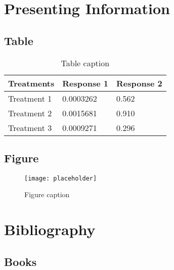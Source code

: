 \documentclass[11pt,fleqn]{book} %
\begin{document}


\chapter{Presenting Information}

\section{Table}

\begin{table}[h]
	\centering
	\begin{tabular}{l l l}
		\toprule
		\textbf{Treatments} & \textbf{Response 1} & \textbf{Response 2}\\
		\midrule
		Treatment 1 & 0.0003262 & 0.562 \\
		Treatment 2 & 0.0015681 & 0.910 \\
		Treatment 3 & 0.0009271 & 0.296 \\
		\bottomrule
	\end{tabular}
	\caption{Table caption}
\end{table}


\section{Figure}

\begin{figure}[h]
	\centering\texttt{[image: placeholder]}
	\caption{Figure caption}
\end{figure}


\chapter*{Bibliography}
\section*{Books}
\printbibliography[heading=bibempty,type=book]
\end{document}
